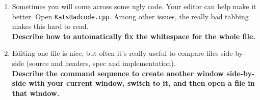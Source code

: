 \documentclass{article}
\begin{document}
\begin{enumerate}
  \item Sometimes you will come across some ugly code. Your editor can help
    make it better. Open \texttt{KatsBadcode.cpp}. Among other issues, the
    really bad tabbing makes this hard to read.\\
    \textbf{Describe how to automatically fix the whitespace for the whole file.}
    \vspace{4em}
  \item Editing one file is nice, but often it's really useful to compare
    files side-by-side (source and headers, spec and implementation).\\
    \textbf{Describe the command sequence to create another window side-by-side with your current window, switch to it, and then open a file in that window.}\\
    \vspace{4em}


\end{enumerate}
\end{document}
